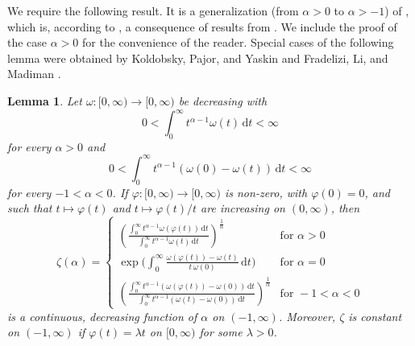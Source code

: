 \documentclass{amsart}
\newtheorem{lemma}[theorem]{Lemma}
\renewcommand{\d}{\,\mathrm{d}}
\begin{document}
We require the following result. It is a generalization (from $\alpha>0$ to $\alpha>-1$) of \cite[Lemma~2.6]{Milman:Pajor}, which is, according to \cite{Milman:Pajor}, a consequence of results from \cite{MOP1967}. We include the proof of the case $\alpha>0$ for the convenience of the reader. Special cases of the following lemma were obtained by Koldobsky, Pajor, and Yaskin \cite[Proof of Lemma 3.3]{KoldobskyPajorYaskin} and Fradelizi, Li, and Madiman \cite[Theorem~6.1]{FradeliziLiMadiman}.




\begin{lemma}
\label{lem_extendedMilmanPajor}
Let $\omega\colon[0,\infty) \to [0,\infty)$ be decreasing with 
$$0<\int_0^{\infty } t^{\alpha-1} \omega (t ) \d t<\infty$$ 
for every $\alpha>0$ and
$$0<\int_0^{\infty } t^{\alpha-1} (\omega (0) - \omega(t)) \d t<\infty$$ 
for every $-1<\alpha<0$.
If $\varphi\colon[0,\infty) \to [0,\infty)$ is non-zero, with $\varphi(0) = 0$, and such that $t\mapsto\varphi(t)$ and $t\mapsto\varphi(t)/t$ are increasing on $(0,\infty)$, 
then
\begin{equation}
\label{eq_zeta}
\zeta(\alpha)=
\begin{cases}
\displaystyle\left(\frac{\int_0^{\infty } t^{\alpha-1} \omega (\varphi(t) ) \d t}{\int_0^{\infty } t^{\alpha-1} \omega (t ) \d t}\right)^{\frac{1}{\alpha}}&\text{for } \alpha>0\\[12pt]
\displaystyle\exp \Big(\int_0^{\infty } \frac{\omega (\varphi(t) ) - \omega(t) }{t \,\omega(0)} \d t\Big)&\text{for } \alpha=0\\[8pt]
\displaystyle \left(\frac{\int_0^{\infty } t^{\alpha-1} (\omega(\varphi(t)) - \omega(0) ) \d t}{\int_0^{\infty } t^{\alpha-1} (\omega(t) - \omega(0)) \d t}\right)^{\frac{1}{\alpha}}&\text{for } -1<\alpha<0
\end{cases}
\end{equation}
is a continuous, decreasing function of $\alpha$ on $(-1, \infty)$. Moreover, $\zeta$ is constant  on $(-1, \infty)$ if $\varphi(t) = \lambda t$ on $[0,\infty)$ for some $\lambda>0$.
\end{lemma}
\end{document}
